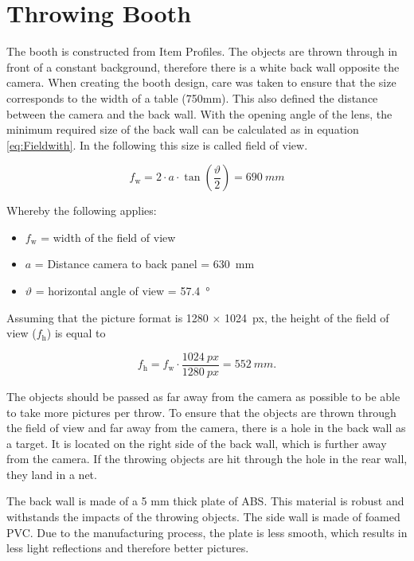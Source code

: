 \section{Throwing Booth}
\label{sec:booth}
The booth is constructed from Item Profiles.
The objects are thrown through in front of a constant background, therefore there is a white back wall opposite the camera.
When creating the booth design, care was taken to ensure that the size corresponds to the width of a table (750mm).
This also defined the distance between the camera and the back wall.
With the opening angle of the lens, the minimum required size of the back wall can be calculated as in equation \ref{eq:Fieldwith}. 
In the following this size is called field of view.

\begin{equation}
	f_\text{w} = 2 \cdot a \cdot \tan\left( \frac{\vartheta}{2}\right) = \SI{690}{mm}
	\label{eq:Fieldwith}
\end{equation}

Whereby the following applies:
\begin{itemize}
	\item $f_\text{w}$ = width of the field of view
	\item $a$ = Distance camera to back panel = \SI{630}{mm}
	\item $\vartheta$ = horizontal angle of view = \SI{57.4}{\degree} \cite{BaumerLense}
\end{itemize}

Assuming that the picture format is 1280 $\times$ \SI{1024}{px}, the height of the field of view ($f_\text{h}$) is equal to

\begin{equation}
	f_\text{h} = f_\text{w} \cdot \frac{\SI{1024}{px}}{\SI{1280}{px}} = \SI{552}{mm}.
	\label{eq:Fieldhight}
\end{equation}

The objects should be passed as far away from the camera as possible to be able to take more pictures per throw.
To ensure that the objects are thrown through the field of view and far away from the camera, there is a hole in the back wall as a target.
It is located on the right side of the back wall, which is further away from the camera.
If the throwing objects are hit through the hole in the rear wall, they land in a net.

The back wall is made of a 5 mm thick plate of ABS.
This material is robust and withstands the impacts of the throwing objects.
The side wall is made of foamed PVC.
Due to the manufacturing process, the plate is less smooth, which results in less light reflections and therefore better pictures.

